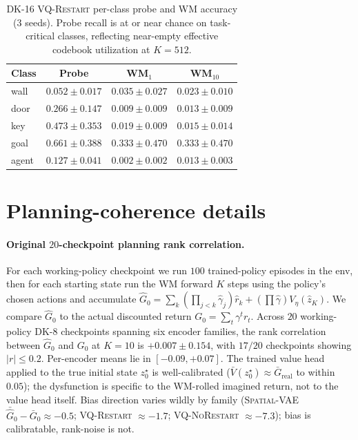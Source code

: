 \documentclass{article}
\newcommand{\encVQNoRestart}{\textsc{VQ-NoRestart}}
\newcommand{\encVQRestart}{\textsc{VQ-Restart}}
\newcommand{\encSpatialVAE}{\textsc{Spatial-VAE}}
\begin{document}
\begin{table}[h]
  \centering
  \caption{DK-16 \encVQRestart{} per-class probe and WM accuracy (3 seeds). Probe recall is at or near chance on task-critical classes, reflecting near-empty effective codebook utilization at $K{=}512$.}
  \label{tab:dk16-v5dc-table}
  \begin{tabular}{l c c c}
    \toprule
    Class & Probe & WM$_1$ & WM$_{10}$ \\
    \midrule
    wall  & $0.052\pm0.017$ & $0.035\pm0.027$ & $0.023\pm0.010$ \\
    door  & $0.266\pm0.147$ & $0.009\pm0.009$ & $0.013\pm0.009$ \\
    key   & $0.473\pm0.353$ & $0.019\pm0.009$ & $0.015\pm0.014$ \\
    goal  & $0.661\pm0.388$ & $0.333\pm0.470$ & $0.333\pm0.470$ \\
    agent & $0.127\pm0.041$ & $0.002\pm0.002$ & $0.013\pm0.003$ \\
    \bottomrule
  \end{tabular}
\end{table}

\section{Planning-coherence details}\label{app:planning-extra}

\paragraph{Original $20$-checkpoint planning rank correlation.} For each working-policy checkpoint we run $100$ trained-policy episodes in the env, then for each starting state run the WM forward $K$ steps using the policy's chosen actions and accumulate $\hat G_0 = \sum_{k} (\prod_{j<k} \hat\gamma_j) \hat r_k + (\prod \hat\gamma) V_\eta(\hat z_K)$. We compare $\hat G_0$ to the actual discounted return $G_0 = \sum_t \gamma^t r_t$. Across $20$ working-policy DK-8 checkpoints spanning six encoder families, the rank correlation between $\hat G_0$ and $G_0$ at $K{=}10$ is $+0.007 \pm 0.154$, with $17/20$ checkpoints showing $|r| \leq 0.2$. Per-encoder means lie in $[-0.09, +0.07]$. The trained value head applied to the true initial state $z^\star_0$ is well-calibrated ($\bar V(z^\star_0) \approx \bar G_{\text{real}}$ to within $0.05$); the dysfunction is specific to the WM-rolled imagined return, not to the value head itself. Bias direction varies wildly by family (\encSpatialVAE{} $\bar{\hat G}_0 - \bar G_0 \approx -0.5$; \encVQRestart{} $\approx -1.7$; \encVQNoRestart{} $\approx -7.3$); bias is calibratable, rank-noise is not.
\end{document}
